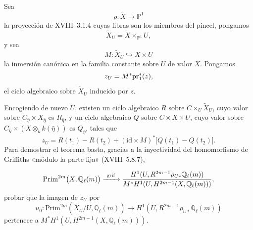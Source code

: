 \pageoriginale

Sea
\begin{equation*}
\rho:\widetilde X\longrightarrow\mathbb P^1
\end{equation*}
la proyección de XVIII~3.1.4 cuyas fibras son los miembros del pincel,
pongamos
\begin{equation*}
\widetilde X_U=\widetilde X\times_{\mathbb P^1}U,
\end{equation*}
y sea
\begin{equation*}
M:\widetilde X_U\hookrightarrow X\times U
\end{equation*}
la inmersión canónica en la familia constante sobre $U$ de valor $X$.
Pongamos
\begin{equation*}
z_U=M^*\mathrm{pr}_{\sisi{i}{1}}^*(z),
\end{equation*}
el ciclo algebraico sobre $\widetilde X_U$ inducido por $z$.

Encogiendo de nuevo $U$, existen un ciclo algebraico $R$ sobre
$C\times_U\widetilde X_U$, cuyo valor sobre
$C_{\bar\eta}\times X_{\bar\eta}$ es $R_{\bar\eta}$, y un ciclo
algebraico $Q$ sobre $C\times X\times U$, cuyo valor sobre
$C_{\bar\eta}\times(X\otimes_k k(\bar\eta))$ es $Q_{\bar\eta}$, tales
que
\begin{equation}\tag{4.4.13}
z_U=R(t_1)-R(t_2)
+(\mathrm{id}\times M)^*\bigl[Q(t_1)-Q(t_2)\bigr].
\end{equation}
Para demostrar el teorema basta, gracias a la inyectividad del
homomorfismo de Griffiths «módulo la parte fija» (XVIII~5.8.7),

\pageoriginale

\begin{equation*}
\mathrm{Prim}^{2m}\bigl(X,\mathbb Q_\ell(\sisi{n}{m})\bigr)
\xrightarrow{\ \operatorname{grif}\ }
\frac{H^1(U,R^{2m-1}\rho_{U*}\mathbb Q_\ell(m))}
{M^*H^1(U,H^{2m-1}(X,\mathbb Q_\ell(m)))},
\end{equation*}
probar que la imagen de $z_U$ por
\begin{equation*}
u_0:\mathrm{Prim}^{2m}(\widetilde X_U/U,\mathbb Q_\ell(m))
\longrightarrow H^1(U,R^{2m-1}\rho_{U*}\mathbb Q_\ell(m))
\end{equation*}
pertenece a
$M^*H^1(U,H^{2m-1}(X,\mathbb Q_\ell(m)))$.

